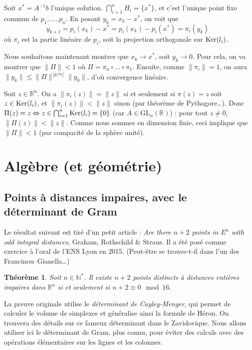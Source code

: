 \documentclass[a4paper, 11pt]{article}
\def\N{\mathbb{N}}
\def\R{\mathbb{R}}
\def\Ker{\textnormal{Ker}}
\def\GL{\mathrm{GL}}
\newtheorem*{theorem}{Théorème}
\begin{document}
Soit $x^* = A^{-1}b$ l'unique solution. $\bigcap_{i=1}^n H_i = \{x^*\}$, et
c'est l'unique point fixe commun de $p_1, \ldots, p_n$. En posant $y_k = x_k -
x^*$, on voit que
\[ y_{k+1} = p_i(x_k) - x^* = p_i(x_k) - p_i(x^*) = \pi_i(y_k) \] où $\pi_i$ est
la partie linéaire de $p_i$, soit la projection orthogonale sur $\Ker(l_i)$.

Nous souhaitons maintenant montrer que $x_k \longrightarrow x^*$, soit $y_k
\longrightarrow 0$. Pour cela, on va montrer que $\|\Pi\| < 1$ où $\Pi = \pi_n
\circ \ldots \circ \pi_1$. Ensuite, comme $\|\pi_i\| = 1$, on aura $\|y_k\| \leq
\|\Pi\|^{\lfloor p/n \rfloor} \|y_0\|$, d'où convergence linéaire.

Soit $z \in \R^n$. On a $\|\pi_i(z)\| = \|z\|$ si et seulement si $\pi(z) = z$
soit $z \in \Ker(l_i)$, et $\|\pi_i(z)\| < \|z\|$ sinon (par théorème de
Pythagore…). Donc $\Pi(z) = z \Leftrightarrow z \in \bigcap_{i=1}^n \Ker(l_i) =
\{0\}$ (car $A \in \GL_n(\R)$) : pour tout $z \neq 0$, $\|\Pi(z)\| < \|z\|$.
Comme nous sommes en dimension finie, ceci implique que $\|\Pi\| < 1$ (par
compacité de la sphère unité).

\newpage

\section{Algèbre (et géométrie)}

\subsection{Points à distances impaires, avec le déterminant de Gram}

Le résultat suivant est tiré d'un petit article : \emph{Are there $n+2$ points
  in $E^n$ with odd integral distances}, Graham, Rothschild \& Straus. Il a été
posé comme exercice à l'oral de l'ENS Lyon en 2015. (Peut-être se trouve-t-il
dans l'un des Francinou--Gianella…)
\begin{theorem}
  Soit $n \in \N^*$. Il existe $n+2$ points distincts à distances entières
  impaires dans $\R^n$ si et seulement si $n+2 \equiv 0 \mod 16$.
\end{theorem}

La preuve originale utilise le \emph{déterminant de Cayley-Menger}, qui permet
de calculer le volume de simplexes et généralise ainsi la formule de Héron. On
trouvera des détails sur ce fameux déterminant dans le Zavidovique. Nous allons
utiliser ici le déterminant de Gram, plus connu, pour éviter des calculs avec
des opérations élémentaires sur les lignes et les colonnes.
\end{document}
